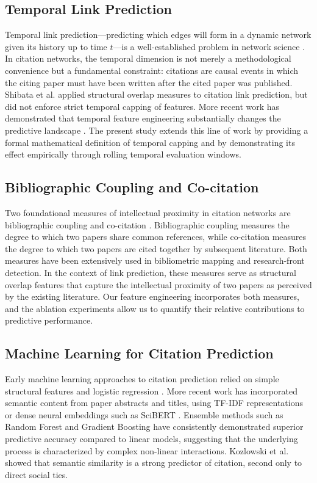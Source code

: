 \documentclass[11pt,a4paper]{article}
\begin{document}
\subsection{Temporal Link Prediction}
Temporal link prediction---predicting which edges will form in a dynamic network given its history up to time $t$---is a well-established problem in network science \citep{liben2007link}. In citation networks, the temporal dimension is not merely a methodological convenience but a fundamental constraint: citations are causal events in which the citing paper must have been written after the cited paper was published. Shibata et al. \citep{shibata2012link} applied structural overlap measures to citation link prediction, but did not enforce strict temporal capping of features. More recent work has demonstrated that temporal feature engineering substantially changes the predictive landscape \citep{chakraborty2015towards}. The present study extends this line of work by providing a formal mathematical definition of temporal capping and by demonstrating its effect empirically through rolling temporal evaluation windows.

\subsection{Bibliographic Coupling and Co-citation}
Two foundational measures of intellectual proximity in citation networks are bibliographic coupling \citep{kessler1963bibliographic} and co-citation \citep{small1973co}. Bibliographic coupling measures the degree to which two papers share common references, while co-citation measures the degree to which two papers are cited together by subsequent literature. Both measures have been extensively used in bibliometric mapping and research-front detection. In the context of link prediction, these measures serve as structural overlap features that capture the intellectual proximity of two papers as perceived by the existing literature. Our feature engineering incorporates both measures, and the ablation experiments allow us to quantify their relative contributions to predictive performance.

\subsection{Machine Learning for Citation Prediction}
Early machine learning approaches to citation prediction relied on simple structural features and logistic regression \citep{liben2007link}. More recent work has incorporated semantic content from paper abstracts and titles, using TF-IDF representations \citep{bhagavatula2018content} or dense neural embeddings such as SciBERT \citep{devlin2019bert}. Ensemble methods such as Random Forest \citep{breiman2001random} and Gradient Boosting \citep{natekin2013gradient} have consistently demonstrated superior predictive accuracy compared to linear models, suggesting that the underlying process is characterized by complex non-linear interactions. Kozlowski et al. \citep{kozlowski2025citation} showed that semantic similarity is a strong predictor of citation, second only to direct social ties.
\end{document}

